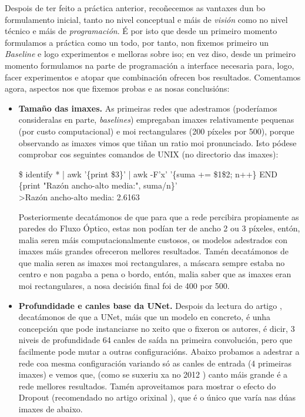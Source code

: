 \documentclass{article}
\begin{document}
Despois de ter feito a práctica anterior, recoñecemos as vantaxes dun bo formulamento inicial, tanto no nivel conceptual e máis de \emph{visión} como no nivel técnico e máis de \emph{programación}. É por isto que desde un primeiro momento formulamos a práctica como un todo, por tanto, non fixemos primeiro un \emph{Baseline} e logo experimentos e melloras sobre iso; en vez diso, desde un primeiro momento formulamos na parte de programación a interface necesaria para, logo, facer experimentos e atopar que combinación ofrecen bos resultados. Comentamos agora, aspectos nos que fixemos probas e as nosas conclusións:

\begin{itemize}
	\item \textbf{Tamaño das imaxes.} As primeiras redes que adestramos (poderíamos consideralas en parte, \emph{baselines}) empregaban imaxes relativamente pequenas (por custo computacional) e moi rectangulares (200 píxeles por 500), porque observando as imaxes vimos que tiñan un ratio moi pronunciado. Isto pódese comprobar cos seguintes comandos de UNIX (no directorio das imaxes):


\begin{tcolorbox}[colback=gray!10!white, colframe=gray!50!black, 
  boxrule=0.5pt, arc=2pt, left=4pt, right=4pt, top=2pt, bottom=2pt,
  fontupper=\ttfamily\small]
\$ identify * | awk '\{print \$3\}' | awk -F'x' '\{suma += \$1\$2; n++\} END \{print "Razón ancho-alto media:", suma/n\}' \\
\>>Razón ancho-alto media: 2.6163
\end{tcolorbox}

Posteriormente decatámonos de que para que a rede percibira propiamente as paredes do Fluxo Óptico, estas non podían ter de ancho 2 ou 3 píxeles, entón, malia seren máis computacionalmente custosos, os modelos adestrados con imaxes máis grandes ofreceron mellores resultados. Tamén decatámonos de que malia seren as imaxes moi rectangulares, a máscara sempre estaba no centro e non pagaba a pena o bordo, entón, malia saber que as imaxes eran moi rectangulares, a nosa decisión final foi de 400 por 500. 

\item \textbf{Profundidade e canles base da UNet.} Despois da lectura do artigo \cite{ronneberger2015u}, decatámonos de que a UNet, máis que un modelo en concreto, é unha concepción que pode instanciarse no xeito que o fixeron os autores, é dicir, 3 niveis de profundidade 64 canles de saída na primeira convolución, pero que facilmente pode mutar a outras configuracións. Abaixo probamos a adestrar a rede coa mesma configuración variando só as canles de entrada (4 primeiras imaxes) e vemos que, (como se suxeriu xa no 2012 \cite{imagenet}) canto máis grande é a rede mellores resultados. Tamén aproveitamos para mostrar o efecto do Dropout \cite{srivastava2014dropout} (recomendado no artigo orixinal \cite{ronneberger2015u}), que é o único que varía nas dúas imaxes de abaixo. 


\end{itemize}
\end{document}
